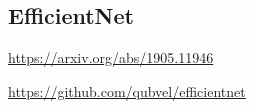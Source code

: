 \subsection{EfficientNet}

\url{https://arxiv.org/abs/1905.11946}

\url{https://github.com/qubvel/efficientnet}